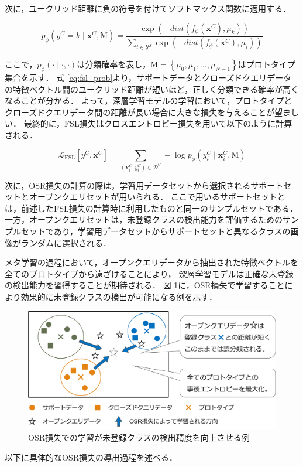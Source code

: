 \documentclass[a4paper,11pt,nomag]{jsreport}
\begin{document}
次に，ユークリッド距離に負の符号を付けてソフトマックス関数に適用する．

\begin{equation}
\label{eq:fsl_prob}
  p_{\phi}(y^C=k \mid \bm{x}^C, \mathrm{M}) 
              = \frac{\exp(-dist(f_\phi(\bm{x}^C),\mu_{k}))}{\sum_{i \in \mathcal{Y}^S} {\exp(-dist(f_\phi(\bm{x}^C),\mu_{i}))}}
\end{equation}

\noindent
ここで，$p_{\phi}(\cdot \mid \cdot, \cdot)$は分類確率を表し，$\mathrm{M} = \left\{\mu_0, \mu_1, \ldots, \mu_{N-1} \right\}$はプロトタイプ集合を示す．
式 \ref{eq:fsl_prob}より，サポートデータとクローズドクエリデータの特徴ベクトル間のユークリッド距離が短いほど，正しく分類できる確率が高くなることが分かる．
よって，深層学習モデルの学習において，プロトタイプとクローズドクエリデータ間の距離が長い場合に大きな損失を与えることが望ましい．
最終的に，FSL損失はクロスエントロピー損失を用いて以下のように計算される．

\begin{equation}
  \mathcal{L}_{\mathrm{FSL}} [y^C, \bm{x}^C] = \sum_{(\bm{x}^C_i,y^C_i) \in \mathcal{D}^C} - \log {p_{\phi} (y^C_i \mid \bm{x}^C_i, \mathrm{M})}
\end{equation}

次に，OSR損失の計算の際は，学習用データセットから選択されるサポートセットとオープンクエリセットが用いられる．
ここで用いるサポートセットとは，前述したFSL損失の計算時に利用したものと同一のサンプルセットである．
一方，オープンクエリセットは，未登録クラスの検出能力を評価するためのサンプルセットであり，学習用データセットからサポートセットと異なるクラスの画像がランダムに選択される．

メタ学習の過程において，オープンクエリデータから抽出された特徴ベクトルを全てのプロトタイプから遠ざけることにより，
深層学習モデルは正確な未登録の検出能力を習得することが期待される．
図 \ref{fig:osr_loss}に，OSR損失で学習することにより効果的に未登録クラスの検出が可能になる例を示す．
% 
\begin{figure}[tbp]
  \centering
  \includegraphics[width=\linewidth, keepaspectratio]{image/osr_loss.png}
  \caption{OSR損失での学習が未登録クラスの検出精度を向上させる例}
  \label{fig:osr_loss}
\end{figure}
% 
以下に具体的なOSR損失の導出過程を述べる．
\end{document}
